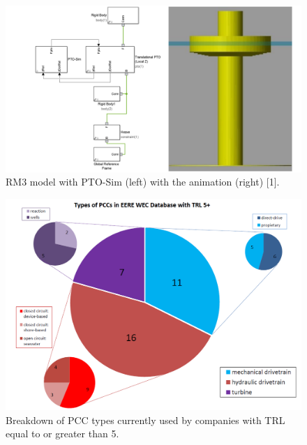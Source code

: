 \documentclass[twocolumn,10pt]{asme2e}
\begin{document}


\begin{figure}[t]
    \centering
    \includegraphics[width=1\columnwidth]{Images/RM3_update}
    \caption{RM3 model with PTO-Sim (left) with the animation (right) [1].}
    \label{RM3}
    \end{figure}

\begin{figure}[t]
    \centering
    \includegraphics[width=1\columnwidth]{Images/TRL}
    \caption{Breakdown of PCC types currently used by companies with TRL equal to or greater than 5.}
    \label{PCC_Breakdown}
    \end{figure}
\end{document}
